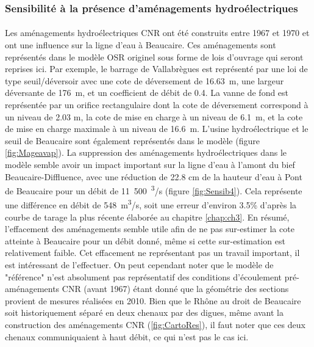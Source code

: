 \FloatBarrier	

	\subsubsection{Sensibilité à la présence d'aménagements hydroélectriques}
	
		\paragraph{} Les aménagements hydroélectriques CNR ont été construits entre 1967 et 1970 et ont une influence sur la ligne d'eau à Beaucaire. Ces aménagements sont représentés dans le modèle OSR originel \citep{launay_zabr-osr_2017} sous forme de lois d'ouvrage qui seront reprises ici. Par exemple, le barrage de Vallabrègues est représenté par une loi de type seuil/déversoir avec une cote de déversement de 16.63~m, une largeur déversante de 176~m, et un coefficient de débit de 0.4. La vanne de fond est représentée par un orifice rectangulaire dont la cote de déversement correspond à un niveau de 2.03 m, la cote de mise en charge à un niveau de 6.1~m, et la cote de mise en charge maximale à un niveau de 16.6~m. L'usine hydroélectrique et le seuil de Beaucaire sont également représentés dans le modèle (figure \ref{fig:Mageavap}). La suppression des aménagements hydroélectriques dans le modèle semble avoir un impact important sur la ligne d'eau à l'amont du bief Beaucaire-Diffluence, avec une réduction de 22.8 cm de la hauteur d'eau à Pont de Beaucaire pour un débit de 11~500~\textsuperscript{3}/s (figure \ref{fig:Sensib4}). Cela représente une différence en débit de 548~m\textsuperscript{3}/s, soit une erreur d'environ 3.5\% d'après la courbe de tarage la plus récente élaborée au chapitre \ref{chap:ch3}. En résumé, l'effacement des aménagements semble utile afin de ne pas sur-estimer la cote atteinte à Beaucaire pour un débit donné, même si cette sur-estimation est relativement faible. Cet effacement ne représentant pas un travail important, il est intéressant de l'effectuer. On peut cependant noter que le modèle de "référence" n'est absolument pas représentatif des conditions d'écoulement pré-aménagements CNR (avant 1967) étant donné que la géométrie des sections provient de mesures réalisées en 2010. Bien que le Rhône au droit de Beaucaire soit historiquement séparé en deux chenaux par des digues, même avant la construction des aménagements CNR (\ref{fig:CartoRes}), il faut noter que ces deux chenaux communiquaient à haut débit, ce qui n'est pas le cas ici. 
		
